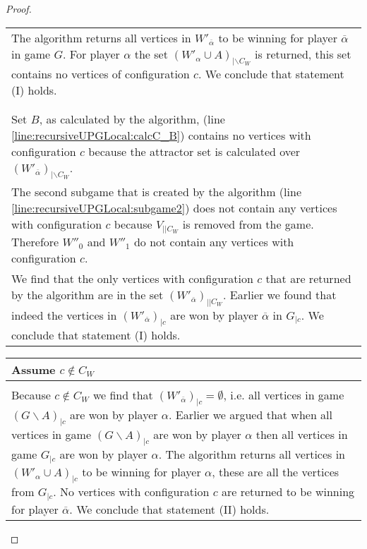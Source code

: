\begin{theorem}
\begin{proof}
\begin{longtable}{|p{14.2cm}}
			\begin{tabular}{|p{14cm}}
				Assume $(W'_{\overline{\alpha}})_{|\backslash C_W} = \emptyset$ (line \ref{line:recursiveUPGLocal:wopponentwithoutCWisempty})\\
				\hline
				The algorithm returns all vertices in $W'_{\overline{\alpha}}$ to be winning for player $\overline{\alpha}$ in game $G$. For player $\alpha$ the set $(W'_\alpha \cup A)_{|\backslash C_W}$ is returned, this set contains no vertices of configuration $c$. We conclude that statement (I) holds.
			\end{tabular}\\\\
			\begin{tabular}{|p{14cm}}
				Assume $(W'_{\overline{\alpha}})_{|\backslash C_W} \neq \emptyset$ (line \ref{line:recursiveUPGLocal:wopponentwithoutCWisempty})\\
				\hline
				Set $B$, as calculated by the algorithm, (line \ref{line:recursiveUPGLocal:calcC_B}) contains no vertices with configuration $c$ because the attractor set is calculated over $(W'_{\overline{\alpha}})_{|\backslash C_W}$.\\
				The second subgame that is created by the algorithm (line \ref{line:recursiveUPGLocal:subgame2}) does not contain any vertices with configuration $c$ because $V_{||C_W}$ is removed from the game. Therefore $W''_0$ and $W''_1$ do not contain any vertices with configuration $c$.\\
				We find that the only vertices with configuration $c$ that are returned by the algorithm are in the set $(W'_{\overline{\alpha}})_{||C_W}$. Earlier we found that indeed the vertices in $(W'_{\overline{\alpha}})_{|c}$ are won by player $\overline{\alpha}$ in $G_{|c}$. We conclude that statement (I) holds.
			\end{tabular}
		\end{longtable}
		\begin{longtable}{|p{14.2cm}}
			Assume $c \notin C_W$\\
			\hline
			\begin{tabular}{|p{14cm}}
				Assume $(W'_{\overline{\alpha}})_{|\backslash C_W} = \emptyset$ (line \ref{line:recursiveUPGLocal:wopponentwithoutCWisempty})\\
				\hline
				Because $c \notin C_W$ we find that $(W'_{\overline{\alpha}})_{|c} = \emptyset$, i.e.  all vertices in game $(G \backslash A)_{|c}$ are won by player $\alpha$. Earlier we argued that when all vertices in game $(G\backslash A)_{|c}$ are won by player $\alpha$ then all vertices in game $G_{|c}$ are won by player $\alpha$. The algorithm returns all vertices in $(W'_\alpha \cup A)_{|c}$ to be winning for player $\alpha$, these are all the vertices from $G_{|c}$. No vertices with configuration $c$ are returned to be winning for player $\overline{\alpha}$. We conclude that statement (II) holds.

\end{tabular}
\end{longtable}
\end{proof}
\end{theorem}
